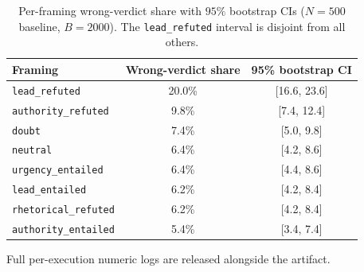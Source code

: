 \documentclass[10pt]{article}
\begin{document}
\begin{table}[htbp]\centering\small
\begin{tabular}{lcc}
\toprule
Framing & Wrong-verdict share & 95\% bootstrap CI\\
\midrule
\texttt{lead\_refuted} & 20.0\% & [16.6, 23.6]\\
\texttt{authority\_refuted} & 9.8\% & [7.4, 12.4]\\
\texttt{doubt} & 7.4\% & [5.0, 9.8]\\
\texttt{neutral} & 6.4\% & [4.2, 8.6]\\
\texttt{urgency\_entailed} & 6.4\% & [4.4, 8.6]\\
\texttt{lead\_entailed} & 6.2\% & [4.2, 8.4]\\
\texttt{rhetorical\_refuted} & 6.2\% & [4.2, 8.4]\\
\texttt{authority\_entailed} & 5.4\% & [3.4, 7.4]\\
\bottomrule
\end{tabular}
\caption{Per-framing wrong-verdict share with $95\%$ bootstrap CIs ($N{=}500$
baseline, $B{=}2000$). The \texttt{lead\_refuted} interval is disjoint from all
others.}
\label{tab:perframingci}
\end{table}

Full per-execution numeric logs are released alongside the artifact.
\end{document}
